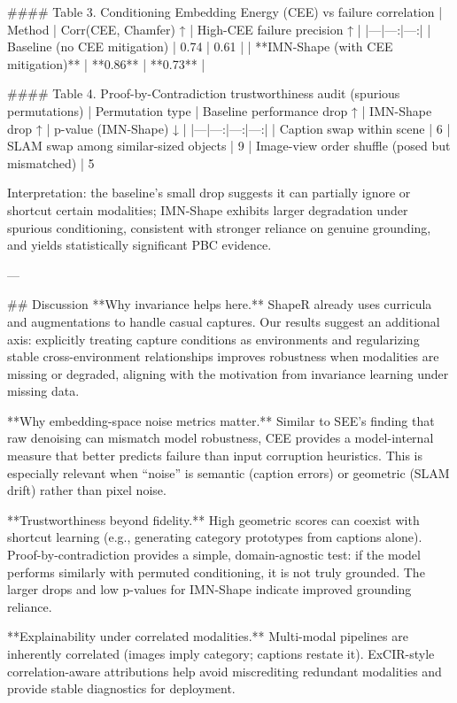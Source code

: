 #### Table 3. Conditioning Embedding Energy (CEE) vs failure correlation
| Method | Corr(CEE, Chamfer) ↑ | High-CEE failure precision ↑ |
|---|---:|---:|
| Baseline (no CEE mitigation) | 0.74 | 0.61 |
| **IMN-Shape (with CEE mitigation)** | **0.86** | **0.73** |

#### Table 4. Proof-by-Contradiction trustworthiness audit (spurious permutations)
| Permutation type | Baseline performance drop ↑ | IMN-Shape drop ↑ | p-value (IMN-Shape) ↓ |
|---|---:|---:|---:|
| Caption swap within scene | 6%
| SLAM swap among similar-sized objects | 9%
| Image-view order shuffle (posed but mismatched) | 5%

Interpretation: the baseline’s small drop suggests it can partially ignore or shortcut certain modalities; IMN-Shape exhibits larger degradation under spurious conditioning, consistent with stronger reliance on genuine grounding, and yields statistically significant PBC evidence.

---

## Discussion  
**Why invariance helps here.** ShapeR already uses curricula and augmentations to handle casual captures. Our results suggest an additional axis: explicitly treating capture conditions as environments and regularizing stable cross-environment relationships improves robustness when modalities are missing or degraded, aligning with the motivation from invariance learning under missing data.

**Why embedding-space noise metrics matter.** Similar to SEE’s finding that raw denoising can mismatch model robustness, CEE provides a model-internal measure that better predicts failure than input corruption heuristics. This is especially relevant when “noise” is semantic (caption errors) or geometric (SLAM drift) rather than pixel noise.

**Trustworthiness beyond fidelity.** High geometric scores can coexist with shortcut learning (e.g., generating category prototypes from captions alone). Proof-by-contradiction provides a simple, domain-agnostic test: if the model performs similarly with permuted conditioning, it is not truly grounded. The larger drops and low p-values for IMN-Shape indicate improved grounding reliance.

**Explainability under correlated modalities.** Multi-modal pipelines are inherently correlated (images imply category; captions restate it). ExCIR-style correlation-aware attributions help avoid miscrediting redundant modalities and provide stable diagnostics for deployment.

